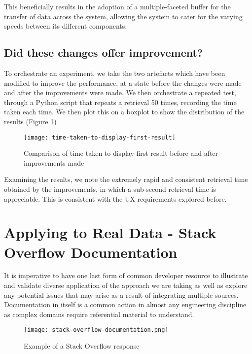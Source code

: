 This beneficially results in the adoption of a multiple-faceted buffer for the transfer of data across the system, allowing the system to cater for the varying speeds between its different components.

\subsection{Did these changes offer improvement?}

To orchestrate an experiment, we take the two artefacts which have been modified to improve the performance, at a state before the changes were made and after the improvements were made. We then orchestrate a repeated test, through a Python script that repeats a retrieval 50 times, recording the time taken each time. We then plot this on a boxplot to show the distribution of the results (Figure \ref{fig:time-taken-to-display-first-result})

\begin{figure}[h!]
	\centering
	\texttt{[image: time-taken-to-display-first-result]}
	\caption{Comparison of time taken to display first result before and after improvements made}
	\label{fig:time-taken-to-display-first-result}
\end{figure}

Examining the results, we note the extremely rapid and consistent retrieval time obtained by the improvements, in which a sub-second retrieval time is appreciable. This is consistent with the UX requirements explored before.

\section{Applying to Real Data - Stack Overflow Documentation}

It is imperative to have one last form of common developer resource to illustrate and validate diverse application of the approach we are taking as well as explore any potential issues that may arise as a result of integrating multiple sources. Documentation in itself is a common action in almost any engineering discipline as complex domains require referential material to understand.

\begin{figure}[h!]
	\centering
	\texttt{[image: stack-overflow-documentation.png]}
	\caption{Example of a Stack Overflow response}
	\label{fig:stackOverflowDocSite}
\end{figure}

